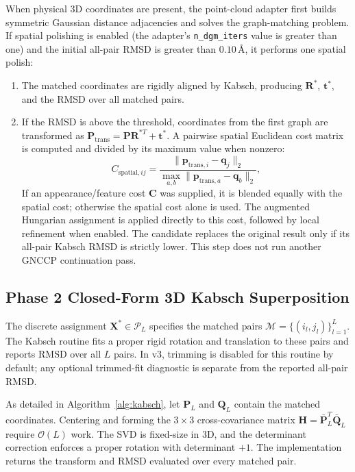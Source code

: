 \documentclass[conference]{IEEEtran}
\begin{document}
When physical 3D coordinates are present, the point-cloud adapter first builds symmetric Gaussian distance adjacencies and solves the graph-matching problem. If spatial polishing is enabled (the adapter's \texttt{n\_dgm\_iters} value is greater than one) and the initial all-pair RMSD is greater than $0.10\,\text{\AA}$, it performs one spatial polish:
\begin{enumerate}
    \item The matched coordinates are rigidly aligned by Kabsch, producing $\mathbf{R}^*$, $\mathbf{t}^*$, and the RMSD over all matched pairs.
    \item If the RMSD is above the threshold, coordinates from the first graph are transformed as $\mathbf{P}_{\text{trans}} = \mathbf{P}\mathbf{R}^{*T} + \mathbf{t}^*$. A pairwise spatial Euclidean cost matrix is computed and divided by its maximum value when nonzero:
    \begin{equation}
    C_{\text{spatial}, ij} = \frac{\|\mathbf{p}_{\text{trans}, i} - \mathbf{q}_j\|_2}{\max_{a, b} \|\mathbf{p}_{\text{trans}, a} - \mathbf{q}_b\|_2},
    \end{equation}
    If an appearance/feature cost $\mathbf{C}$ was supplied, it is blended equally with the spatial cost; otherwise the spatial cost alone is used. The augmented Hungarian assignment is applied directly to this cost, followed by local refinement when enabled. The candidate replaces the original result only if its all-pair Kabsch RMSD is strictly lower. This step does not run another GNCCP continuation pass.
\end{enumerate}

\subsection{Phase 2 Closed-Form 3D Kabsch Superposition}

The discrete assignment $\mathbf{X}^* \in \mathcal{P}_L$ specifies the matched pairs $\mathcal{M} = \{(i_l, j_l)\}_{l=1}^L$. The Kabsch routine fits a proper rigid rotation and translation to these pairs and reports RMSD over all $L$ pairs. In v3, trimming is disabled for this routine by default; any optional trimmed-fit diagnostic is separate from the reported all-pair RMSD.

As detailed in Algorithm~\ref{alg:kabsch}, let $\mathbf{P}_L$ and $\mathbf{Q}_L$ contain the matched coordinates. Centering and forming the $3 \times 3$ cross-covariance matrix $\mathbf{H}=\bar{\mathbf{P}}_L^T\bar{\mathbf{Q}}_L$ require $\mathcal{O}(L)$ work. The SVD is fixed-size in 3D, and the determinant correction enforces a proper rotation with determinant $+1$. The implementation returns the transform and RMSD evaluated over every matched pair.
\end{document}

